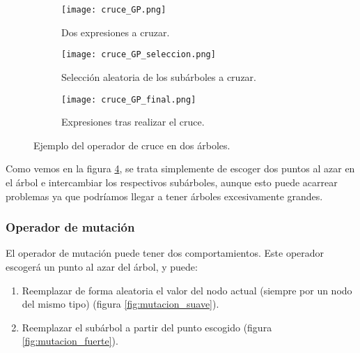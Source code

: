\begin{figure}[H]
    \centering
	 \begin{subfigure}[b]{\textwidth}
		 \centering
		 \texttt{[image: cruce\_GP.png]}
		 \caption{Dos expresiones a cruzar.}
		 \label{fig:cruce_GP}
	 \end{subfigure}

	\begin{subfigure}[b]{\textwidth}
		 \centering
		\texttt{[image: cruce\_GP\_seleccion.png]}
		\caption{Selección aleatoria de los subárboles a cruzar.}
		\label{fig:cruce_GP_seleccion}
   \end{subfigure}

	\begin{subfigure}[b]{\textwidth}
		\centering
	  \texttt{[image: cruce\_GP\_final.png]}
	  \caption{Expresiones tras realizar el cruce.}
	  \label{fig:cruce_GP_final}
   \end{subfigure}

	\caption{Ejemplo del operador de cruce en dos árboles.}
	\label{fig:ej_cruce_GP}
\end{figure}

Como vemos en la figura \ref{fig:ej_cruce_GP}, se trata simplemente de escoger dos puntos al azar en el árbol e intercambiar los respectivos subárboles, aunque esto puede acarrear problemas ya que podríamos llegar a tener árboles excesivamente grandes.

\subsubsection{Operador de mutación}

El operador de mutación puede tener dos comportamientos. Este operador escogerá un punto al azar del árbol, y puede:

\begin{enumerate}
	\item Reemplazar de forma aleatoria el valor del nodo actual (siempre por un nodo del mismo tipo) (figura \ref{fig:mutacion_suave}).
	\item Reemplazar el subárbol a partir del punto escogido (figura \ref{fig:mutacion_fuerte}).
\end{enumerate}

